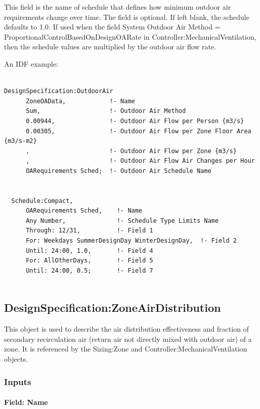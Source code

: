 This field is the name of schedule that defines how minimum outdoor air requirements change over time. The field is optional. If left blank, the schedule defaults to 1.0. If used when the field System Outdoor Air Method = ProportionalControlBasedOnDesignOARate in Controller:MechanicalVentilation, then the schedule values are multiplied by the outdoor air flow rate.

An IDF example:

\begin{lstlisting}

DesignSpecification:OutdoorAir
      ZoneOAData,            !- Name
      Sum,                   !- Outdoor Air Method
      0.00944,               !- Outdoor Air Flow per Person {m3/s}
      0.00305,               !- Outdoor Air Flow per Zone Floor Area {m3/s-m2}
      ,                      !- Outdoor Air Flow per Zone {m3/s}
      ,                      !- Outdoor Air Flow Air Changes per Hour
      OARequirements Sched;  !- Outdoor Air Schedule Name


  Schedule:Compact,
      OARequirements Sched,    !- Name
      Any Number,              !- Schedule Type Limits Name
      Through: 12/31,          !- Field 1
      For: Weekdays SummerDesignDay WinterDesignDay,  !- Field 2
      Until: 24:00, 1.0,       !- Field 4
      For: AllOtherDays,       !- Field 5
      Until: 24:00, 0.5;       !- Field 7
      
\end{lstlisting}

\subsection{DesignSpecification:ZoneAirDistribution}\label{designspecificationzoneairdistribution}

This object is used to describe the air distribution effectiveness and fraction of secondary recirculation air (return air not directly mixed with outdoor air) of a zone. It is referenced by the Sizing:Zone and Controller:MechanicalVentilation objects.

\subsubsection{Inputs}\label{inputs-1-011}

\paragraph{Field: Name}\label{field-name-1-010}

